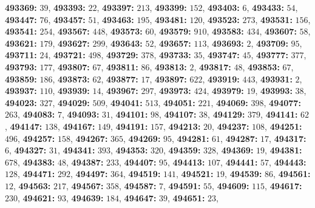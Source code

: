 \textsf{\bfseries 493369:} $39$, \textsf{\bfseries 493393:} $22$, \textsf{\bfseries 493397:} $213$, \textsf{\bfseries 493399:} $152$, \textsf{\bfseries 493403:} $6$, \textsf{\bfseries 493433:} $54$, \textsf{\bfseries 493447:} $76$, \textsf{\bfseries 493457:} $51$, \textsf{\bfseries 493463:} $195$, \textsf{\bfseries 493481:} $120$, \textsf{\bfseries 493523:} $273$, \textsf{\bfseries 493531:} $156$, \textsf{\bfseries 493541:} $254$, \textsf{\bfseries 493567:} $448$, \textsf{\bfseries 493573:} $60$, \textsf{\bfseries 493579:} $910$, \textsf{\bfseries 493583:} $434$, \textsf{\bfseries 493607:} $58$, \textsf{\bfseries 493621:} $179$, \textsf{\bfseries 493627:} $299$, \textsf{\bfseries 493643:} $52$, \textsf{\bfseries 493657:} $113$, \textsf{\bfseries 493693:} $2$, \textsf{\bfseries 493709:} $95$, \textsf{\bfseries 493711:} $24$, \textsf{\bfseries 493721:} $498$, \textsf{\bfseries 493729:} $378$, \textsf{\bfseries 493733:} $35$, \textsf{\bfseries 493747:} $45$, \textsf{\bfseries 493777:} $377$, \textsf{\bfseries 493793:} $177$, \textsf{\bfseries 493807:} $67$, \textsf{\bfseries 493811:} $86$, \textsf{\bfseries 493813:} $2$, \textsf{\bfseries 493817:} $48$, \textsf{\bfseries 493853:} $67$, \textsf{\bfseries 493859:} $186$, \textsf{\bfseries 493873:} $62$, \textsf{\bfseries 493877:} $17$, \textsf{\bfseries 493897:} $622$, \textsf{\bfseries 493919:} $443$, \textsf{\bfseries 493931:} $2$, \textsf{\bfseries 493937:} $110$, \textsf{\bfseries 493939:} $14$, \textsf{\bfseries 493967:} $297$, \textsf{\bfseries 493973:} $424$, \textsf{\bfseries 493979:} $19$, \textsf{\bfseries 493993:} $38$, \textsf{\bfseries 494023:} $327$, \textsf{\bfseries 494029:} $509$, \textsf{\bfseries 494041:} $513$, \textsf{\bfseries 494051:} $221$, \textsf{\bfseries 494069:} $398$, \textsf{\bfseries 494077:} $263$, \textsf{\bfseries 494083:} $7$, \textsf{\bfseries 494093:} $31$, \textsf{\bfseries 494101:} $98$, \textsf{\bfseries 494107:} $38$, \textsf{\bfseries 494129:} $379$, \textsf{\bfseries 494141:} $62$, \textsf{\bfseries 494147:} $138$, \textsf{\bfseries 494167:} $149$, \textsf{\bfseries 494191:} $157$, \textsf{\bfseries 494213:} $20$, \textsf{\bfseries 494237:} $108$, \textsf{\bfseries 494251:} $496$, \textsf{\bfseries 494257:} $158$, \textsf{\bfseries 494267:} $365$, \textsf{\bfseries 494269:} $95$, \textsf{\bfseries 494281:} $61$, \textsf{\bfseries 494287:} $17$, \textsf{\bfseries 494317:} $6$, \textsf{\bfseries 494327:} $31$, \textsf{\bfseries 494341:} $393$, \textsf{\bfseries 494353:} $320$, \textsf{\bfseries 494359:} $328$, \textsf{\bfseries 494369:} $19$, \textsf{\bfseries 494381:} $678$, \textsf{\bfseries 494383:} $48$, \textsf{\bfseries 494387:} $233$, \textsf{\bfseries 494407:} $95$, \textsf{\bfseries 494413:} $107$, \textsf{\bfseries 494441:} $57$, \textsf{\bfseries 494443:} $128$, \textsf{\bfseries 494471:} $292$, \textsf{\bfseries 494497:} $364$, \textsf{\bfseries 494519:} $141$, \textsf{\bfseries 494521:} $19$, \textsf{\bfseries 494539:} $86$, \textsf{\bfseries 494561:} $12$, \textsf{\bfseries 494563:} $217$, \textsf{\bfseries 494567:} $358$, \textsf{\bfseries 494587:} $7$, \textsf{\bfseries 494591:} $55$, \textsf{\bfseries 494609:} $115$, \textsf{\bfseries 494617:} $230$, \textsf{\bfseries 494621:} $93$, \textsf{\bfseries 494639:} $184$, \textsf{\bfseries 494647:} $39$, \textsf{\bfseries 494651:} $23$, 
